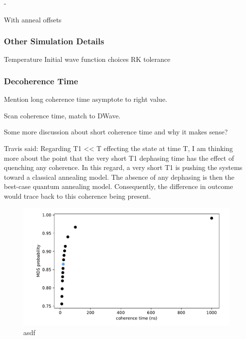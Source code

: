 -\documentclass[prd,twocolumn,tightenlines,preprintnumbers,showpacs,superscriptaddress,notitlepage,nofootinbib,eqsecnum,floatfix,longbibliography]{revtex4}
\begin{document}
With anneal offsets
\subsubsection{Other Simulation Details}
Temperature
Initial wave function choices
RK tolerance

\subsubsection{Decoherence Time}
\label{sec:methods:deco}

Mention long coherence time asymptote to right value.

Scan coherence time, match to DWave.

Some more discussion about short coherence time and why it makes sense?

Travis said: Regarding T1 << T effecting the state at time T, I am thinking more about the point that the very short T1 dephasing time has the effect of quenching any coherence.
In this regard, a very short T1 is pushing the systems toward a classical annealing model.
The absence of any dephasing is then the best-case quantum annealing model.
Consequently, the difference in outcome would trace back to this coherence being present.

\begin{figure}
    \centering
    \includegraphics[width=\columnwidth]{./figures/coherence.pdf}
    \caption{asdf}
    \label{fig:prob_mi}
\end{figure}
\end{document}
